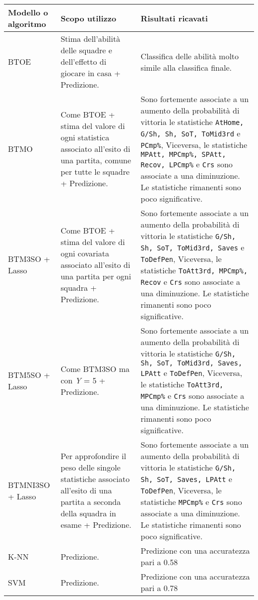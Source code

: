 \begin{table}[]
\begin{longtable}{|C{0.18\textwidth}|C{0.3\textwidth}|C{0.5\textwidth}|}
	\hline	
	\textbf{Modello o algoritmo} & \textbf{Scopo utilizzo} & \textbf{Risultati ricavati}\\
	\hline			
	BTOE & Stima dell'abilità delle squadre e dell'effetto di giocare in casa + Predizione. & Classifica delle abilità molto simile alla classifica finale. \\
	\hline	
	BTMO & Come BTOE + stima del valore di ogni statistica associato all'esito di una partita, comune per tutte le squadre + Predizione. & Sono fortemente associate a un aumento della probabilità di vittoria le statistiche \texttt{AtHome, G/Sh, Sh, SoT, ToMid3rd} e \texttt{PCmp\%}, Viceversa, le statistiche \texttt{MPAtt, MPCmp\%, SPAtt, Recov, LPCmp\%} e \texttt{Crs} sono associate a una diminuzione. Le statistiche rimanenti sono poco significative.\\
	\hline	
	BTM3SO + Lasso & Come BTOE + stima del valore di ogni covariata associato all'esito di una partita per ogni squadra + Predizione. & Sono fortemente associate a un aumento della probabilità di vittoria le statistiche \texttt{G/Sh, Sh, SoT, ToMid3rd, Saves} e \texttt{ToDefPen}, Viceversa, le statistiche \texttt{ToAtt3rd, MPCmp\%, Recov} e \texttt{Crs} sono associate a una diminuzione. Le statistiche rimanenti sono poco significative. \\
	\hline	
	BTM5SO + Lasso & Come BTM3SO ma con \emph{Y} = 5 + Predizione. & Sono fortemente associate a un aumento della probabilità di vittoria le statistiche \texttt{G/Sh, Sh, SoT, ToMid3rd, Saves, LPAtt} e \texttt{ToDefPen}, Viceversa, le statistiche \texttt{ToAtt3rd, MPCmp\%} e \texttt{Crs} sono associate a una diminuzione. Le statistiche rimanenti sono poco significative. \\
	\hline	
	BTMNI3SO + Lasso & Per approfondire il peso delle singole statistiche associato all'esito di una partita a seconda della squadra in esame + Predizione. & Sono fortemente associate a un aumento della probabilità di vittoria le statistiche \texttt{G/Sh, Sh, SoT, Saves, LPAtt} e \texttt{ToDefPen}, Viceversa, le statistiche \texttt{MPCmp\%} e \texttt{Crs} sono associate a una diminuzione. Le statistiche rimanenti sono poco significative. \\
	\hline	
	K-NN & Predizione. & Predizione con una accuratezza pari a 0.58\\
	\hline	
	SVM & Predizione. & Predizione con una accuratezza pari a 0.78\\

\end{longtable}
\end{table}
